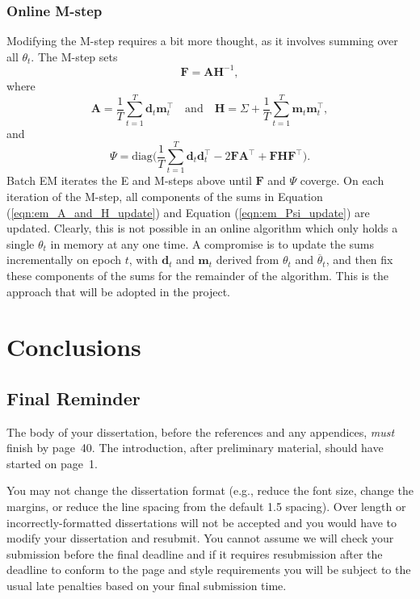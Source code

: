 \documentclass[msc,deptreport.inf]{infthesis} %
\newcommand{\matr}[1]{\mathbf{#1}}
\begin{document}
\subsection{Online M-step}

Modifying the M-step requires a bit more thought, as it involves summing over all $\theta_t$. The M-step sets
\begin{equation}
	\matr{F} = \matr{A}\matr{H}^{-1},
\end{equation}
where
\begin{equation}\label{eqn:em_A_and_H_update}
	\matr{A} = \frac{1}{T} \sum_{t=1}^T \matr{d}_t \matr{m}_t^\intercal \quad \text{and} \quad 
	\matr{H} = \Sigma + \frac{1}{T} \sum_{t=1}^T \matr{m}_t \matr{m}_t^\intercal,
\end{equation}
and
\begin{equation}\label{eqn:em_Psi_update}
	\Psi = \text{diag}\Bigg( \frac{1}{T} \sum_{t=1}^T \matr{d}_t \matr{d}_t^\intercal - 2\matr{FA}^\intercal + \matr{FHF}^\intercal \Bigg).
\end{equation}
Batch EM iterates the E and M-steps above until $\matr{F}$ and $\Psi$ coverge. On each iteration of the M-step, all components of the sums in Equation (\ref{eqn:em_A_and_H_update}) and Equation (\ref{eqn:em_Psi_update}) are updated. Clearly, this is not possible in an online algorithm which only holds a single $\theta_t$ in memory at any one time. A compromise is to update the sums incrementally on epoch $t$, with $\matr{d}_t$ and $\matr{m}_t$ derived from $\theta_t$ and $\overline{\theta}_t$, and then fix these components of the sums for the remainder of the algorithm. This is the approach that will be adopted in the project. 




\chapter{Conclusions}

\section{Final Reminder}

The body of your dissertation, before the references and any appendices,
\emph{must} finish by page~40. The introduction, after preliminary material,
should have started on page~1.

You may not change the dissertation format (e.g., reduce the font
size, change the margins, or reduce the line spacing from the default
1.5 spacing). Over length or incorrectly-formatted dissertations will
not be accepted and you would have to modify your dissertation and
resubmit.  You cannot assume we will check your submission before the
final deadline and if it requires resubmission after the deadline to
conform to the page and style requirements you will be subject to the
usual late penalties based on your final submission time.
\end{document}
